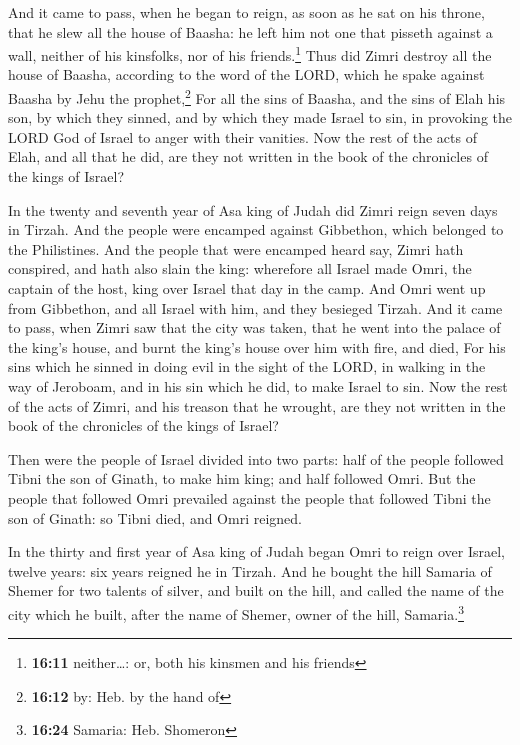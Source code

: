  And it came to pass, when he began to reign, as soon as
he sat on his throne, that he slew all the house of Baasha: he left him
not one that pisseth against a wall, neither of his kinsfolks, nor of
his friends.\footnote{\textbf{16:11} neither\ldots: or, both his kinsmen
  and his friends}  Thus did Zimri destroy all the house
of Baasha, according to the word of the LORD, which he spake against
Baasha by Jehu the prophet,\footnote{\textbf{16:12} by: Heb. by the hand
  of}  For all the sins of Baasha, and the sins of Elah
his son, by which they sinned, and by which they made Israel to sin, in
provoking the LORD God of Israel to anger with their vanities.
 Now the rest of the acts of Elah, and all that he did,
are they not written in the book of the chronicles of the kings of
Israel?

 In the twenty and seventh year of Asa king of Judah did
Zimri reign seven days in Tirzah. And the people were encamped against
Gibbethon, which belonged to the Philistines.  And the
people that were encamped heard say, Zimri hath conspired, and hath also
slain the king: wherefore all Israel made Omri, the captain of the host,
king over Israel that day in the camp.  And Omri went up
from Gibbethon, and all Israel with him, and they besieged Tirzah.
 And it came to pass, when Zimri saw that the city was
taken, that he went into the palace of the king's house, and burnt the
king's house over him with fire, and died,  For his sins
which he sinned in doing evil in the sight of the LORD, in walking in
the way of Jeroboam, and in his sin which he did, to make Israel to sin.
 Now the rest of the acts of Zimri, and his treason that
he wrought, are they not written in the book of the chronicles of the
kings of Israel?

 Then were the people of Israel divided into two parts:
half of the people followed Tibni the son of Ginath, to make him king;
and half followed Omri.  But the people that followed
Omri prevailed against the people that followed Tibni the son of Ginath:
so Tibni died, and Omri reigned.

 In the thirty and first year of Asa king of Judah began
Omri to reign over Israel, twelve years: six years reigned he in Tirzah.
 And he bought the hill Samaria of Shemer for two talents
of silver, and built on the hill, and called the name of the city which
he built, after the name of Shemer, owner of the hill,
Samaria.\footnote{\textbf{16:24} Samaria: Heb. Shomeron}

